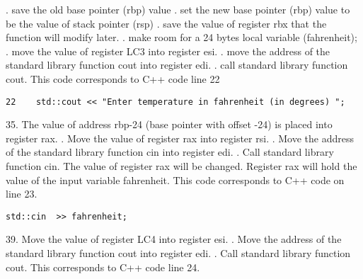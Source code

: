 \documentclass{article}
\theoremstyle{theorem}
\theoremstyle{definition}
\theoremstyle{remark}
\begin{document}
\newline {}. save the old base pointer (rbp) value
\newline {}. set the new base pointer (rbp) value to be the value of stack pointer (rsp)
\newline {}. save the value of register rbx that the function will modify later. 
\newline {}. make room for a 24 bytes local variable (fahrenheit);
\newline {}. move the value of register LC3 into register esi.
\newline {}. move the address of the standard library function cout into register edi.
\newline {}. call standard library function cout. This code corresponds to C++ code line 22
\begin{lstlisting}
22    std::cout << "Enter temperature in fahrenheit (in degrees) ";
\end{lstlisting}
35. The value of address rbp-24 (base pointer with offset -24) is placed into register rax.
\newline {}. Move the value of register rax into register rsi. 
\newline {}. Move the address of the standard library function cin into register edi.
\newline {}. Call standard library function cin. The value of register rax will be changed. Register rax will hold the value of the input variable fahrenheit. This code corresponds to C++ code on line 23.
\begin{lstlisting}
std::cin  >> fahrenheit;
\end{lstlisting}
39. Move the value of register LC4 into register esi. 
\newline {}. Move the address of the standard library function cout into register edi.
\newline {}. Call standard library function cout. This corresponds to C++ code line 24. 
\end{document}
